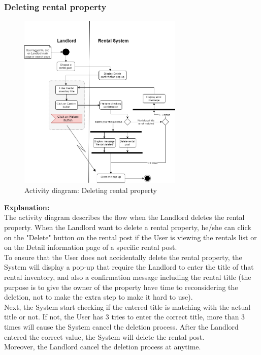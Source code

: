 \subsubsection{Deleting rental property}
\begin{figure}[H]
    \centering
    \includegraphics[width=0.7\textwidth]{Images/Activity/ac_diag_delete_post.png}
    \caption{Activity diagram: Deleting rental property}
    \label{fig:delete-rental}
\end{figure}
\noindent \textbf{Explanation:}\\
The activity diagram describes the flow when the Landlord deletes the rental property. When the Landlord want to delete a rental property, he/she can click on the "Delete" button on the rental post if the User is viewing the rentals list or on the Detail information page of a specific rental post.\\
To ensure that the User does not accidentally delete the rental property, the System will display a pop-up that require the Landlord to enter the title of that rental inventory, and also a confirmation message including the rental title (the purpose is to give the owner of the property have time to reconsidering the deletion, not to make the extra step to make it hard to use). \\
Next, the System start checking if the entered title is matching with the actual title or not. If not, the User has 3 tries to enter the correct title, more than 3 times will cause the System cancel the deletion process. After the Landlord entered the correct value, the System will delete the rental post. \\
Moreover, the Landlord cancel the deletion process at anytime.


